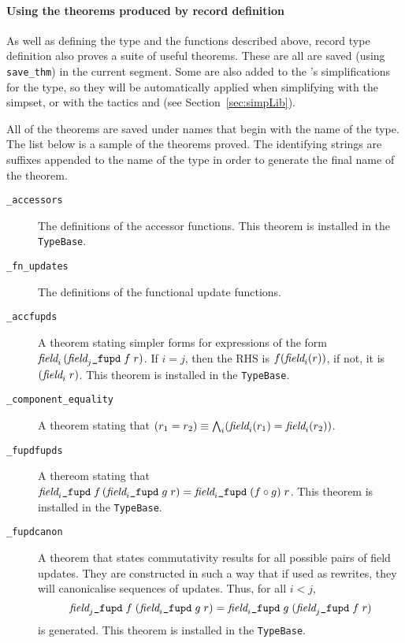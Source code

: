 \paragraph{Using the theorems produced by record definition}

As well as defining the type and the functions described above, record
type definition also proves a suite of useful theorems.  These are all
are saved (using {\tt save\_thm}) in the current segment.  %
%
%
Some are also added to the 's simplifications for the
type, so they will be automatically applied when simplifying with the
 simpset, or with the tactics  and
 (see Section~\ref{sec:simpLib}).

All of the theorems are saved under names that begin with the name of
the type.  The list below is a sample of the theorems proved.  The
identifying strings are suffixes appended to the name of the type in
order to generate the final name of the theorem.

\newcommand{\rewruse}{This theorem is installed in the \texttt{TypeBase}.}
\newcommand{\field}[1]{\mbox{\it field}_{#1}}
\newcommand{\update}{\mbox{\tt\_fupd}}

\begin{description}
\item[\texttt{\_accessors}] The definitions of the accessor functions.
  \rewruse
\item[\texttt{\_fn\_updates}] The definitions of the functional update
  functions.
\item[\texttt{\_accfupds}] A theorem stating simpler forms for
  expressions of the form $\field{i}\, (\field{j}\update\;f\; r)$.  If
  $i = j$, then the RHS is $f (\field{i}(r))$, if not, it is $(\field{i}\;r)$.
  \rewruse
\item[\texttt{\_component\_equality}] A theorem stating that $(r_1 =
  r_2) \equiv \bigwedge_i (\field{i}(r_1) = \field{i}(r_2))$.
\item[\texttt{\_fupdfupds}] A thereom stating that $\field{i}\update
  \;f \,(\field{i}\update \;g\;r) = \field{i}\update\;(f \circ g)\;r$.
  \rewruse
\item[\texttt{\_fupdcanon}] A theorem that states commutativity results
  for all possible pairs of field updates.  They are constructed in
  such a way that if used as rewrites, they will canonicalise
  sequences of updates. Thus, for all $i < j$, \[
  \field{j}\update\;f\;(\field{i}\update\;g\;r) =
  \field{i}\update\;g\;(\field{j}\update\;f\;r)
  \] is generated.
 \rewruse
\end{description}

